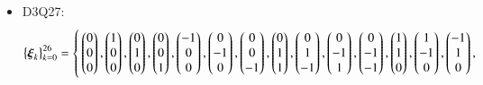         \begin{itemize}
            \item[] D3Q27: \begin{align}
                \label{eq:VelModD3Q27}
                    \begin{split}            
                    \left\{\boldsymbol{\xi}_k\right\}_{k=0}^{26} = \vast\{ &\begin{pmatrix} 0 \\ 0 \\ 0 \end{pmatrix}, \begin{pmatrix} 1 \\ 0 \\ 0 \end{pmatrix}, \begin{pmatrix} 0 \\ 1 \\ 0 \end{pmatrix}, \begin{pmatrix} 0 \\ 0 \\ 1 \end{pmatrix}, \begin{pmatrix} -1 \\ 0 \\ 0 \end{pmatrix}, \begin{pmatrix} 0 \\ -1 \\ 0 \end{pmatrix}, \begin{pmatrix} 0 \\ 0 \\ -1 \end{pmatrix}, \begin{pmatrix} 0 \\ 1 \\ 1 \end{pmatrix}, \begin{pmatrix} 0 \\ 1 \\ -1 \end{pmatrix}, \begin{pmatrix} 0\\ -1 \\ 1 \end{pmatrix}, \begin{pmatrix} 0 \\ -1 \\ -1 \end{pmatrix},  \begin{pmatrix} 1 \\ 1 \\ 0 \end{pmatrix},  \begin{pmatrix} 1 \\ -1 \\ 0 \end{pmatrix}, \begin{pmatrix} -1 \\ 1 \\ 0 \end{pmatrix},  \\ 

\end{split}
\end{align}
\end{itemize}

